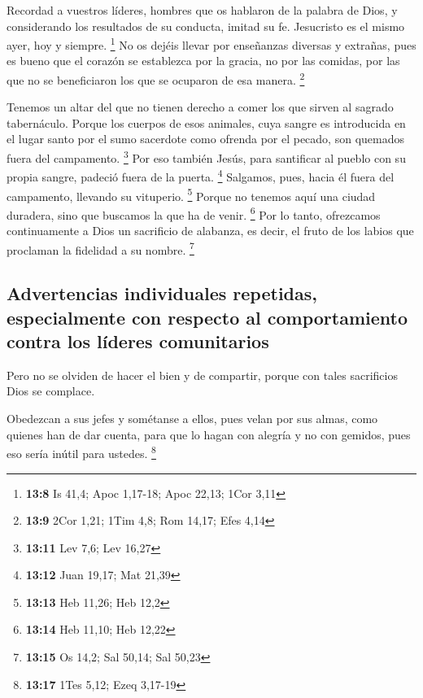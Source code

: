 \begin{paracol}{2}
 Recordad a vuestros líderes, hombres que os hablaron de
la palabra de Dios, y considerando los resultados de su conducta, imitad
su fe.  Jesucristo es el mismo ayer, hoy y siempre.
\footnote{\textbf{13:8} Is 41,4; Apoc 1,17-18; Apoc 22,13; 1Cor 3,11}
 No os dejéis llevar por enseñanzas diversas y extrañas,
pues es bueno que el corazón se establezca por la gracia, no por las
comidas, por las que no se beneficiaron los que se ocuparon de esa
manera. \footnote{\textbf{13:9} 2Cor 1,21; 1Tim 4,8; Rom 14,17; Efes
  4,14}

 Tenemos un altar del que no tienen derecho a comer los
que sirven al sagrado tabernáculo.  Porque los cuerpos de
esos animales, cuya sangre es introducida en el lugar santo por el sumo
sacerdote como ofrenda por el pecado, son quemados fuera del campamento.
\footnote{\textbf{13:11} Lev 7,6; Lev 16,27}  Por eso
también Jesús, para santificar al pueblo con su propia sangre, padeció
fuera de la puerta. \footnote{\textbf{13:12} Juan 19,17; Mat 21,39}
 Salgamos, pues, hacia él fuera del campamento, llevando
su vituperio. \footnote{\textbf{13:13} Heb 11,26; Heb 12,2}
 Porque no tenemos aquí una ciudad duradera, sino que
buscamos la que ha de venir. \footnote{\textbf{13:14} Heb 11,10; Heb
  12,22}  Por lo tanto, ofrezcamos continuamente a Dios
un sacrificio de alabanza, es decir, el fruto de los labios que
proclaman la fidelidad a su nombre. \footnote{\textbf{13:15} Os 14,2;
  Sal 50,14; Sal 50,23}

\hypertarget{advertencias-individuales-repetidas-especialmente-con-respecto-al-comportamiento-contra-los-luxedderes-comunitarios}{%
\subsection{Advertencias individuales repetidas, especialmente con
respecto al comportamiento contra los líderes
comunitarios}\label{advertencias-individuales-repetidas-especialmente-con-respecto-al-comportamiento-contra-los-luxedderes-comunitarios}}

 Pero no se olviden de hacer el bien y de compartir,
porque con tales sacrificios Dios se complace.

 Obedezcan a sus jefes y sométanse a ellos, pues velan
por sus almas, como quienes han de dar cuenta, para que lo hagan con
alegría y no con gemidos, pues eso sería inútil para ustedes.
\footnote{\textbf{13:17} 1Tes 5,12; Ezeq 3,17-19}


\end{paracol}
